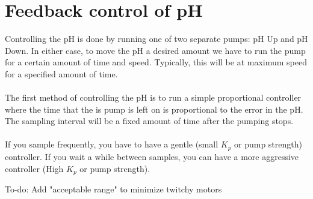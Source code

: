 \documentclass[12pt]{article}
\begin{document}
\section{Feedback control of pH}
Controlling the pH is done by running one of two separate pumps: pH Up and pH Down. In either case, to move the pH a desired amount we have to run the pump for a certain amount of time and speed. Typically, this will be at maximum speed for a specified amount of time. 
\\\\
The first method of controlling the pH is to run a simple proportional controller where the time that the is pump is left on is proportional to the error in the pH. The sampling interval will be a fixed amount of time after the pumping stops.
\\\\
If you sample frequently, you have to have a gentle (small $K_p$ or pump strength) controller. If you wait a while between samples, you can have a more aggressive controller (High $K_p$ or pump strength).


To-do: Add "acceptable range" to minimize twitchy motors
\end{document}

